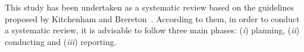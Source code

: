 This study has been undertaken as a systematic review based on the guidelines proposed by Kitchenham and Brereton~\cite{Kitchenham}. According to them, in order to conduct a systematic review, it is advisable to follow three main phases: (\textit{i}) planning, (\textit{ii}) conducting and (\textit{iii}) reporting. %


